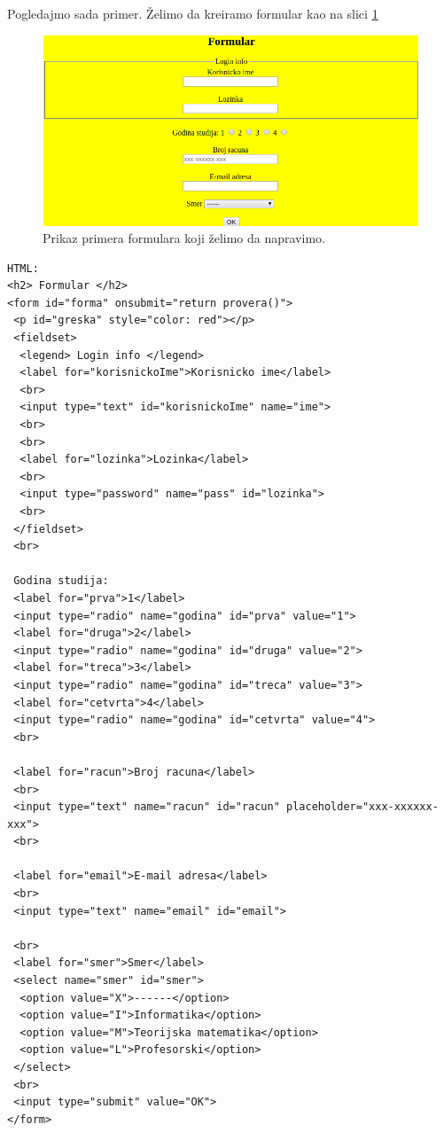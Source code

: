 Pogledajmo sada primer. Želimo da kreiramo formular kao na slici \ref{fig:formular}
\begin{figure}[h!]
\begin{center}
\includegraphics[scale=0.5]{pictures/formular.png}
\end{center}
\caption{Prikaz primera formulara koji želimo da napravimo.}
\label{fig:formular}
\end{figure}	  

\begin{lstlisting}[backgroundcolor = \color{lightgray}, breaklines=true]
HTML:
<h2> Formular </h2>
<form id="forma" onsubmit="return provera()">
 <p id="greska" style="color: red"></p>
 <fieldset>
  <legend> Login info </legend>
  <label for="korisnickoIme">Korisnicko ime</label>
  <br>
  <input type="text" id="korisnickoIme" name="ime">
  <br>
  <br>
  <label for="lozinka">Lozinka</label>
  <br>
  <input type="password" name="pass" id="lozinka">
  <br>    
 </fieldset>
 <br>
 
 Godina studija:
 <label for="prva">1</label>
 <input type="radio" name="godina" id="prva" value="1">
 <label for="druga">2</label>
 <input type="radio" name="godina" id="druga" value="2">
 <label for="treca">3</label>
 <input type="radio" name="godina" id="treca" value="3">
 <label for="cetvrta">4</label>
 <input type="radio" name="godina" id="cetvrta" value="4">
 <br>

 <label for="racun">Broj racuna</label>
 <br>
 <input type="text" name="racun" id="racun" placeholder="xxx-xxxxxx-xxx">
 <br>
 
 <label for="email">E-mail adresa</label>
 <br>
 <input type="text" name="email" id="email">
                
 <br>
 <label for="smer">Smer</label>
 <select name="smer" id="smer">
  <option value="X">------</option>
  <option value="I">Informatika</option>
  <option value="M">Teorijska matematika</option>
  <option value="L">Profesorski</option>
 </select>
 <br>
 <input type="submit" value="OK">
</form>
\end{lstlisting}

